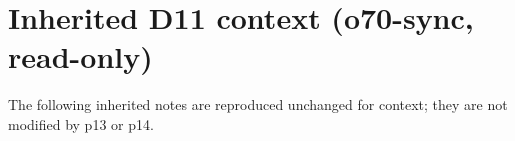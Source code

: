 











\section{Inherited D11 context (o70-sync, read-only)}
The following inherited notes are reproduced unchanged for context; they are not modified by p13 or p14.



